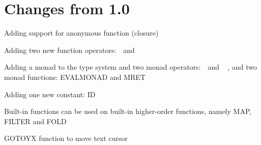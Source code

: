 \chapter{Changes from 1.0}

\begin{itemlist}
\item Adding support for anonymous function (closure)
\item Adding two new function operators: \basicapply\ \,and\ \,\basiccompo
\item Adding a monad to the type system and two monad operators: \basicmbind\ \,and\ \,\basicmseq\ , and two monad functions: EVALMONAD and MRET
\item Adding one new constant: ID
\item Built-in functions can be used on built-in higher-order functions, namely MAP, FILTER and FOLD
\item GOTOYX function to move text cursor
\end{itemlist}
